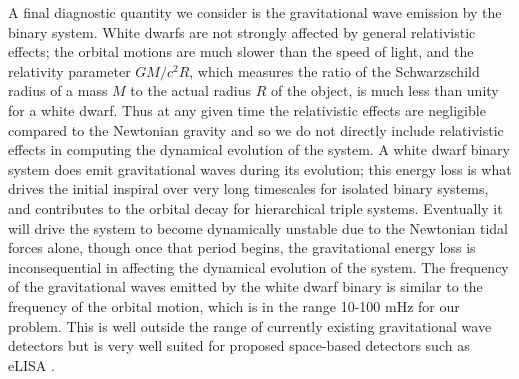 \documentclass[12pt]{article}
\begin{document}
A final diagnostic quantity we consider is the gravitational wave emission by the 
binary system. White dwarfs are not strongly affected by general relativistic effects;
the orbital motions are much slower than the speed of light, and the relativity parameter 
$GM / c^2 R$, which measures the ratio of the Schwarzschild radius of a mass $M$ to the actual 
radius $R$ of the object, is much less than unity for a white dwarf. Thus at any given time the 
relativistic effects are negligible compared to the Newtonian gravity and so we do not 
directly include relativistic effects in computing the dynamical evolution of the system.
A white dwarf binary system does emit gravitational waves during its evolution; this energy loss 
is what drives the initial inspiral over very long timescales for isolated binary systems, and
contributes to the orbital decay for hierarchical triple systems. Eventually it will drive the system 
to become dynamically unstable due to the Newtonian tidal forces alone, though once that period begins, 
the gravitational energy loss is inconsequential in affecting the dynamical evolution of the system. 
The frequency of the gravitational waves emitted by the white dwarf binary 
is similar to the frequency of the orbital motion, which is in the range 
10-100 mHz for our problem. This is well outside the range of currently existing 
gravitational wave detectors but is very well suited for proposed space-based detectors such as eLISA \citep{eLISA}.
\end{document}
